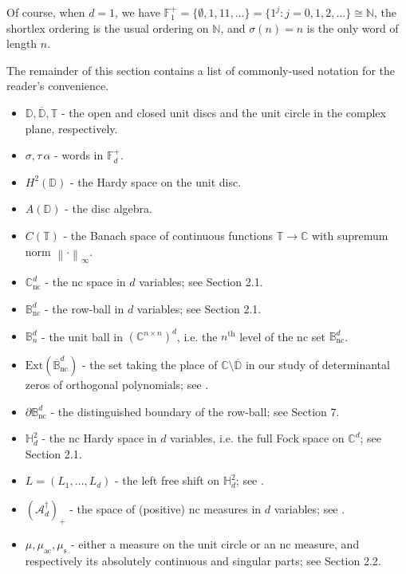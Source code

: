 \documentclass[11pt,reqno]{amsart}
\newcommand\norm[1]{\left\lVert#1\right\rVert}
\newcommand\ncm[1]{(\mathscr{A}_{#1}^{\dagger})_+}
\def\a{\alpha}
\def\s{\sigma}
\def\t{\tau}
\def\NN{\mathbb{N}}
\def\CC{\mathbb{C}}
\def\DD{\mathbb{D}}
\def\BB{\mathbb{B}}
\def\TT{\mathbb{T}}
\def\FF{\mathbb{F}}
\def\HH{\mathbb{H}}
\def\nc{\mathrm{nc}}
\def\ac{\mathrm{ac}}
\def\rms{\mathrm{s}}
\theoremstyle{definition}
\numberwithin{equation}{section}
\begin{document}
Of course, when \(d = 1\), we have \(\FF_1^+ = \{\emptyset, 1, 11, \ldots \} = \{1^{j} : j = 0, 1, 2, \ldots\} \cong \NN\), the shortlex ordering is the usual ordering on \(\NN\), and \(\s(n) = n\) is the only word of length \(n\).

\bigskip

The remainder of this section contains a list of commonly-used notation for the reader's convenience.

\bigskip

\begin{itemize}
    \item \(\DD, \overline{\DD}, \TT\) - the open and closed unit discs and the unit circle in the complex plane, respectively.
    \item \(\s, \t\, \a\) - words in \(\FF_d^+\).
    \item \(H^2(\DD)\) - the Hardy space on the unit disc.
    \item \(A(\DD)\) - the disc algebra.
    \item \(C(\TT)\) - the Banach space of continuous functions \(\TT \to \CC\) with supremum norm \(\norm{\cdot}_\infty\).
    \item \(\CC^d_{\nc}\) - the nc space in \(d\) variables; see Section 2.1.
    \item \(\BB_{\nc}^d\) - the row-ball in \(d\) variables; see Section 2.1.
    \item \(\BB^d_n\) - the unit ball in \((\CC^{n\times n})^d\), i.e. the \(n^{\text{th}}\) level of the nc set \(\BB^d_\nc\).
    \item \(\mathrm{Ext}(\overline{\BB}^d_{\nc})\) - the set taking the place of \(\CC\setminus\overline{\DD}\) in our study of determinantal zeros of orthogonal polynomials; see .
    \item \(\partial \BB_{\nc}^d\) - the distinguished boundary of the row-ball; see Section 7.
    \item \(\HH^2_d\) - the nc Hardy space in \(d\) variables, i.e. the full Fock space on \(\CC^d\); see Section 2.1.
    \item \(L = (L_1, \ldots, L_d)\) - the left free shift on \(\HH^2_d\); see .
    \item \(\ncm{d}\) - the space of (positive) nc measures in \(d\) variables; see .
    \item \(\mu, \mu_{\ac}, \mu_\rms\) - either a measure on the unit circle or an nc measure, and respectively its absolutely continuous and singular parts; see Section 2.2.

\end{itemize}
\end{document}
